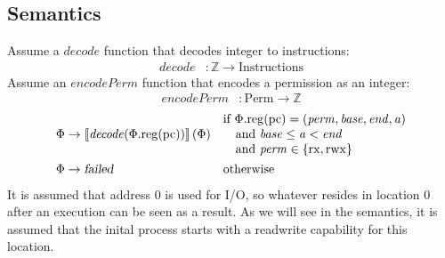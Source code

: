 \documentclass{article}
\newcommand{\sem}[1]{\left\llbracket #1 \right\rrbracket}
\newcommand{\var}[1]{\mathit{#1}}
\newcommand{\pcreg}{\mathrm{pc}}
\newcommand{\addr}{\var{a}}
\newcommand{\start}{\var{base}}
\newcommand{\addrend}{\var{end}}
\newcommand{\perm}{\var{perm}}
\newcommand{\stdcap}[1][\perm]{\left(#1,\start,\addrend,\addr \right)}
\newcommand{\plainproj}[1]{\mathrm{#1}}
\newcommand{\memreg}[1][\Phi]{#1.\plainproj{reg}}
\newcommand{\failed}{\textsl{failed}}
\newcommand{\plainfun}[1]{\mathit{#1}}
\newcommand{\decode}{\plainfun{decode}}
\newcommand{\encodePerm}{\plainfun{encodePerm}}
\newcommand{\plaindom}[1]{\mathrm{#1}}
\newcommand{\Instrs}{\plaindom{Instructions}}
\newcommand{\ints}{\mathbb{Z}}
\newcommand{\Perms}{\plaindom{Perm}}
\newcommand{\plainperm}[1]{\mathrm{#1}}
\newcommand{\exec}{\plainperm{rx}}
\newcommand{\rwx}{\plainperm{rwx}}
\begin{document}
\subsection*{Semantics}
Assume a $\decode$ function that decodes integer to instructions:
\begin{align*}
\decode &:\ints \rightarrow \Instrs
\end{align*}
Assume an $\encodePerm$ function that encodes a permission as an integer:
\begin{align*}
\encodePerm &: \Perms \rightarrow \ints
\end{align*}
\begin{align*}
  \Phi & \rightarrow \sem{\decode(\memreg(\pcreg))}(\Phi) & &                                   
                                                              \arraycolsep=0pt
                                                              \begin{array}{l}
                                                                \text{if $\memreg(\pcreg) = \stdcap$}\\
                                                                \quad\text{and $\start \leq \addr < \addrend$}\\
                                                                \quad\text{and $\perm \in \{ \exec,\rwx \}$ }
                                                              \end{array}\\
\Phi & \rightarrow \failed                                 & & \text{otherwise}
\end{align*}
It is assumed that address 0 is used for I/O, so whatever resides in location 0 after an execution can be seen as a result. As we will see in the semantics, it is assumed that the inital process starts with a readwrite capability for this location.
\end{document}
